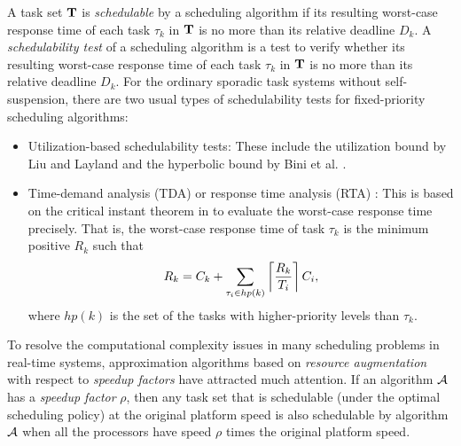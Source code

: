 A task set ${\bf T}$ is \emph{schedulable} by a scheduling algorithm if its resulting worst-case response time of each task 
$\tau_k$ in ${\bf T}$ is no more than its relative deadline $D_k$.
A \emph{schedulability test} of a scheduling algorithm is a test to
verify whether its resulting worst-case response time of each task
$\tau_k$ in ${\bf T}$ is no more than its relative deadline $D_k$. For
the ordinary sporadic task systems without self-suspension, there are
two usual types of schedulability tests for fixed-priority scheduling
algorithms:
\begin{itemize}
\item Utilization-based schedulability tests: These include the
  utilization bound by Liu and Layland \cite{Liu_1973}  and the
  hyperbolic bound by Bini et al. \cite{bini2003rate}.
\item Time-demand analysis (TDA) or response time analysis (RTA) \cite{lehoczky-1989}: This is based on the critical instant
  theorem in
  \cite{Liu_1973} to evaluate the worst-case response time
  precisely. That is, the worst-case response time of task $\tau_k$ is
  the minimum positive $R_k$ such that
  \begin{equation}
   \label{eq:rta}
  R_k = C_k+ \sum_{\tau_i \in hp(k)}\left\lceil{\frac{R_k}{T_i}}\right\rceil C_i,     
  \end{equation}
  where $hp(k)$ is the set of the tasks with higher-priority levels
  than $\tau_k$.  
\end{itemize}


To resolve the computational complexity issues in many scheduling problems in real-time systems, approximation algorithms based on \textit{resource augmentation} with respect to \emph{speedup factors} have attracted much attention.  If an algorithm ${\cal A}$ has a \emph{speedup factor} $\rho$, then any task set that is schedulable (under the optimal scheduling policy) at the original platform speed is also schedulable by algorithm ${\cal A}$ when all the processors have speed $\rho$ times the original platform speed.




